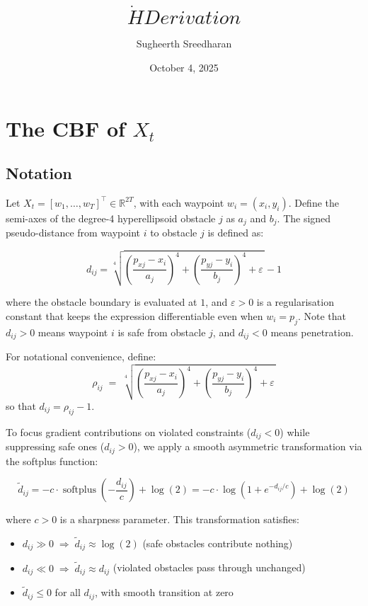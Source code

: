 \documentclass{article}
\title{\[\dot{H} Derivation\]}
\author{Sugheerth Sreedharan }
\date{October 4, 2025}
\newcommand{\softplus}{\operatorname{softplus}}
\begin{document}
\maketitle

\section{The CBF of $X_t$}

\subsection*{Notation}

Let $X_t = [w_1, \dots, w_T]^\top \in \mathbb{R}^{2T}$, with each waypoint $w_i = (x_i, y_i)$.
Define the semi-axes of the degree-4 hyperellipsoid obstacle $j$ as $a_j$ and $b_j$. The signed pseudo-distance from waypoint $i$ to obstacle $j$ is defined as:

\begin{equation}
    d_{ij} = \sqrt[4]{\left(\frac{p_{xj} - x_i}{a_j}\right)^4 + \left(\frac{p_{yj} - y_i}{b_j}\right)^4 + \varepsilon\,} - 1
\end{equation}

where the obstacle boundary is evaluated at $1$, and $\varepsilon > 0$ is a regularisation constant that keeps the expression differentiable even when $w_i = p_j$.
Note that $d_{ij} > 0$ means waypoint $i$ is safe from obstacle $j$, and $d_{ij} < 0$ means penetration.

For notational convenience, define:
\begin{equation}
    \rho_{ij} \;=\; \sqrt[4]{\left(\frac{p_{xj} - x_i}{a_j}\right)^4 + \left(\frac{p_{yj} - y_i}{b_j}\right)^4 + \varepsilon\,}
\end{equation}
so that $d_{ij} = \rho_{ij} - 1$.

To focus gradient contributions on violated constraints ($d_{ij} < 0$)
while suppressing safe ones ($d_{ij} > 0$), we apply a smooth asymmetric
transformation via the softplus function:

\begin{equation}
    \tilde{d}_{ij}
    = -c \cdot \softplus\!\left(-\frac{d_{ij}}{c}\right) + \log(2)
    = -c \cdot \log\!\left(1 + e^{-d_{ij}/c}\right) + \log(2)
\end{equation}

where $c > 0$ is a sharpness parameter. This transformation satisfies:
\begin{itemize}
    \item $d_{ij} \gg 0 \;\Rightarrow\; \tilde{d}_{ij} \approx \log(2)$
          \quad (safe obstacles contribute nothing)
    \item $d_{ij} \ll 0 \;\Rightarrow\; \tilde{d}_{ij} \approx d_{ij}$
          \quad (violated obstacles pass through unchanged)
    \item $\tilde{d}_{ij} \leq 0$ for all $d_{ij}$, with smooth transition at zero
\end{itemize}
\end{document}

